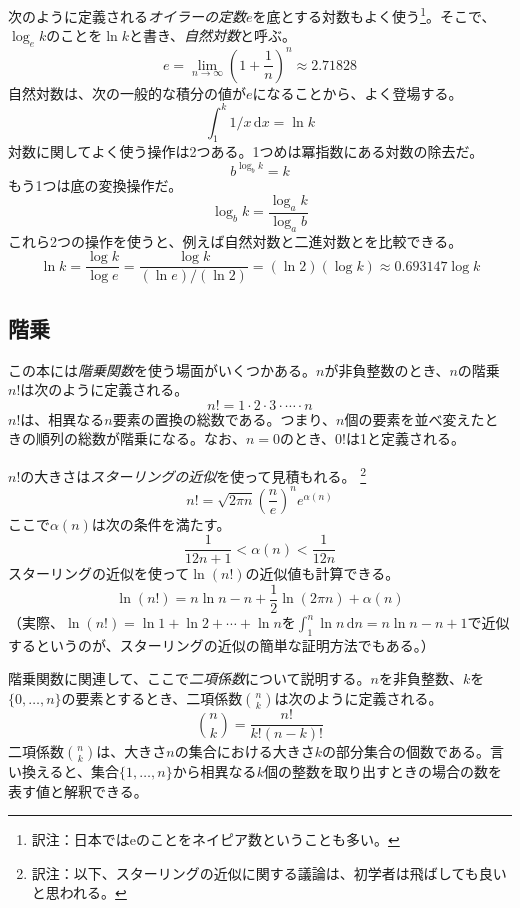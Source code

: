 %
%
次のように定義される\emph{オイラーの定数}$e$を底とする対数もよく使う\footnote{訳注：日本ではeのことをネイピア数ということも多い。}。そこで、$\log_e k$のことを$\ln k$と書き、\emph{自然対数}と呼ぶ。%
%
\[
   e = \lim_{n\rightarrow\infty} \left(1+\frac{1}{n}\right)^n
   \approx  2.71828
\]
自然対数は、次の一般的な積分の値が$e$になることから、よく登場する。
\[
    \int_{1}^{k} 1/x\,\mathrm{d}x  = \ln k
\]
対数に関してよく使う操作は2つある。1つめは冪指数にある対数の除去だ。
\[
    b^{\log_b k} = k
\]
もう1つは底の変換操作だ。
\[
    \log_b k = \frac{\log_a k}{\log_a b}
\]
これら2つの操作を使うと、例えば自然対数と二進対数とを比較できる。
\[
   \ln k = \frac{\log k}{\log e} = \frac{\log k}{(\ln e)/(\ln 2)} =
    (\ln 2)(\log k) \approx 0.693147\log k
\]

\subsection{階乗}

この本には\emph{階乗関数}を使う場面がいくつかある。$n$が非負整数のとき、$n$の階乗$n!$は次のように定義される。
\[
   n! = 1\cdot2\cdot3\cdot\cdots\cdot n
\]
$n!$は、相異なる$n$要素の置換の総数である。つまり、$n$個の要素を並べ変えたときの順列の総数が階乗になる。なお、$n=0$のとき、$0!$は1と定義される。

%
$n!$の大きさは\emph{スターリングの近似}を使って見積もれる。
\footnote{訳注：以下、スターリングの近似に関する議論は、初学者は飛ばしても良いと思われる。}%
\[
  n!
   = \sqrt{2\pi n}\left(\frac{n}{e}\right)^{n}e^{\alpha(n)}
\]
ここで$\alpha(n)$は次の条件を満たす。
\[
   \frac{1}{12n+1} <  \alpha(n) < \frac{1}{12n}
\]
スターリングの近似を使って$\ln(n!)$の近似値も計算できる。
\[
   \ln(n!) = n\ln n - n + \frac{1}{2}\ln(2\pi n) + \alpha(n)
\]
（実際、$\ln(n!)=\ln 1 + \ln 2  + \cdots + \ln n$を$\int_1^n \ln n\,\mathrm{d}n = n\ln n - n +1$で近似するというのが、スターリングの近似の簡単な証明方法でもある。）

%
階乗関数に関連して、ここで\emph{二項係数}について説明する。$n$を非負整数、$k$を$\{0,\ldots,n\}$の要素とするとき、二項係数$\binom{n}{k}$は次のように定義される。
\[
   \binom{n}{k} = \frac{n!}{k!(n-k)!}
\]
二項係数$\binom{n}{k}$は、大きさ$n$の集合における大きさ$k$の部分集合の個数である。言い換えると、集合$\{1,\ldots,n\}$から相異なる$k$個の整数を取り出すときの場合の数を表す値と解釈できる。 %


